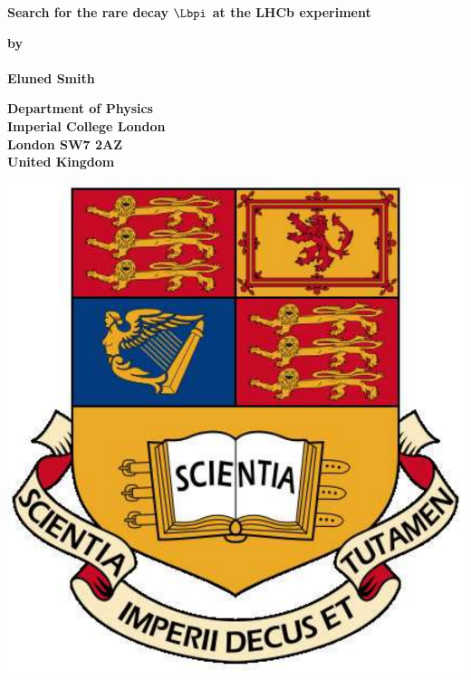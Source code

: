 \thispagestyle{empty}
\null\vskip0.2in%
\begin{center}
\LARGE{{\bf 
Search for the rare decay $\Lbpi$ at the LHCb experiment}}      
\end{center}

\vspace{0.5cm}

\begin{center}
{\Large {\bf by}}\\
\mbox{} \\
{\Large {\bf Eluned Smith}}
\end{center}

\vspace{1cm}

\begin{center}
\large{\bf{Department of Physics \\ Imperial College London \\
London SW7 2AZ \\ United Kingdom}}
\end{center}


\vspace{1.5cm}

\centering
\includegraphics[scale=0.4]{IC_Crest}
\newpage



